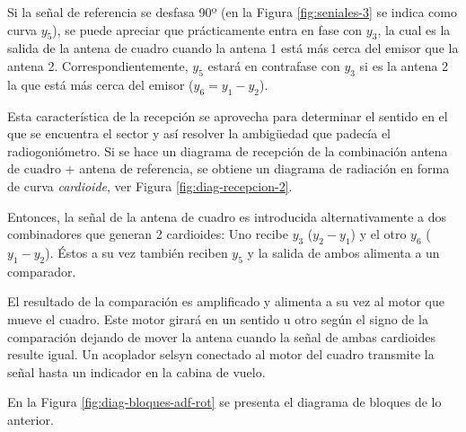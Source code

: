 Si la se\~nal de referencia se desfasa 90º (en la Figura \ref{fig:seniales-3} se indica como curva $y_5$), se puede apreciar que pr\'acticamente entra en fase con $y_3$, la cual es la salida de la antena de cuadro cuando la antena 1 est\'a m\'as cerca del emisor que la antena 2. Correspondientemente, $y_5$ estar\'a en contrafase con $y_3$ si es la antena 2 la que est\'a m\'as cerca del emisor ($y_6 = y_1 - y_2$). %

Esta caracter\'istica de la recepci\'on se aprovecha para determinar el sentido en el que se encuentra el sector y as\'i resolver la ambigüedad que padec\'ia el radiogoni\'ometro. Si se hace un diagrama de recepci\'on de la combinaci\'on antena de cuadro + antena de referencia, se obtiene un diagrama de radiaci\'on en forma de curva \emph{cardioide}, ver Figura \ref{fig:diag-recepcion-2}.


Entonces, la se\~nal de la antena de cuadro es introducida alternativamente a dos combinadores que generan 2 cardioides: Uno recibe $y_3$ ($y_2-y_1$) y el otro $y_6$ ($y_1-y_2$). \'Estos a su vez tambi\'en reciben $y_5$ y la salida de ambos alimenta a un comparador.

El resultado de la comparaci\'on es amplificado y alimenta a su vez al motor que mueve el cuadro. Este motor girar\'a en un sentido u otro seg\'un el signo de la comparaci\'on dejando de mover la antena cuando la se\~nal de ambas cardioides resulte igual. Un acoplador selsyn conectado al motor del cuadro transmite la se\~nal hasta un indicador en la cabina de vuelo.

En la Figura \ref{fig:diag-bloques-adf-rot} se presenta el diagrama de bloques de lo anterior.



 
